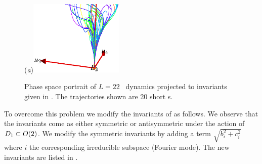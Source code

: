 \begin{figure}[t]
\begin{center}
  (\textit{a})\includegraphics[width=0.4\textwidth]{../figs/ksSO2inv145eqbTo0.eps}
\end{center}
\caption[KSe SO(2) reduced phase space with modified invariants.]{ Phase space portrait of $L=22$ \KS\ dynamics projected to invariants given in . The trajectories shown are 20 short \rpo s.
   }
\label{fig:ksSO2eqbTo0}
\end{figure}

To overcome this problem we modify the invariants of   as follows. We observe that the invariants come as either symmetric or antisymmetric under the action of $D_{1}\subset O(2)$. We modify the symmetric invariants by adding a term $\sqrt{b_i^2+c_i^2}$ where $i$ the corresponding irreducible subspace  (Fourier mode). The new invariants are listed in .

